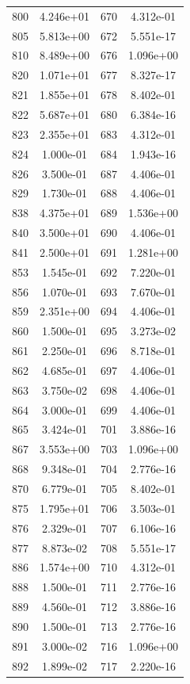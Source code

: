 \documentclass[12pt]{article}
\begin{document}
\begin{longtable}{@{}cccc@{}}
800 & 4.246e+01 & 670 & 4.312e-01 \\
805 & 5.813e+00 & 672 & 5.551e-17 \\
810 & 8.489e+00 & 676 & 1.096e+00 \\
820 & 1.071e+01 & 677 & 8.327e-17 \\
821 & 1.855e+01 & 678 & 8.402e-01 \\
822 & 5.687e+01 & 680 & 6.384e-16 \\
823 & 2.355e+01 & 683 & 4.312e-01 \\
824 & 1.000e-01 & 684 & 1.943e-16 \\
826 & 3.500e-01 & 687 & 4.406e-01 \\
829 & 1.730e-01 & 688 & 4.406e-01 \\
838 & 4.375e+01 & 689 & 1.536e+00 \\
840 & 3.500e+01 & 690 & 4.406e-01 \\
841 & 2.500e+01 & 691 & 1.281e+00 \\
853 & 1.545e-01 & 692 & 7.220e-01 \\
856 & 1.070e-01 & 693 & 7.670e-01 \\
859 & 2.351e+00 & 694 & 4.406e-01 \\
860 & 1.500e-01 & 695 & 3.273e-02 \\
861 & 2.250e-01 & 696 & 8.718e-01 \\
862 & 4.685e-01 & 697 & 4.406e-01 \\
863 & 3.750e-02 & 698 & 4.406e-01 \\
864 & 3.000e-01 & 699 & 4.406e-01 \\
865 & 3.424e-01 & 701 & 3.886e-16 \\
867 & 3.553e+00 & 703 & 1.096e+00 \\
868 & 9.348e-01 & 704 & 2.776e-16 \\
870 & 6.779e-01 & 705 & 8.402e-01 \\
875 & 1.795e+01 & 706 & 3.503e-01 \\
876 & 2.329e-01 & 707 & 6.106e-16 \\
877 & 8.873e-02 & 708 & 5.551e-17 \\
886 & 1.574e+00 & 710 & 4.312e-01 \\
888 & 1.500e-01 & 711 & 2.776e-16 \\
889 & 4.560e-01 & 712 & 3.886e-16 \\
890 & 1.500e-01 & 713 & 2.776e-16 \\
891 & 3.000e-02 & 716 & 1.096e+00 \\
892 & 1.899e-02 & 717 & 2.220e-16 \\

\end{longtable}
\end{document}
